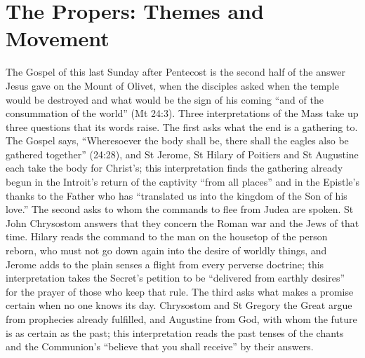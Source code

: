 
\section{The Propers: Themes and Movement}

The Gospel of this last Sunday after Pentecost is the second half of the
answer Jesus gave on the Mount of Olivet, when the disciples asked when the
temple would be destroyed and what would be the sign of his coming ``and of
the consummation of the world'' (Mt 24:3). Three interpretations of the Mass
take up three questions that its words raise. The first asks what the end is
a gathering to. The Gospel says, ``Wheresoever the body shall be, there shall
the eagles also be gathered together'' (24:28), and St Jerome, St Hilary of
Poitiers and St Augustine each take the body for Christ's; this
interpretation finds the gathering already begun in the Introit's return of
the captivity ``from all places'' and in the Epistle's thanks to the Father
who has ``translated us into the kingdom of the Son of his love.'' The second
asks to whom the commands to flee from Judea are spoken. St John Chrysostom
answers that they concern the Roman war and the Jews of that time. Hilary
reads the command to the man on the housetop of the person reborn, who must
not go down again into the desire of worldly things, and Jerome adds to the
plain senses a flight from every perverse doctrine; this interpretation takes
the Secret's petition to be ``delivered from earthly desires'' for the prayer
of those who keep that rule. The third asks what makes a promise certain when
no one knows its day. Chrysostom and St Gregory the Great argue from
prophecies already fulfilled, and Augustine from God, with whom the future is
as certain as the past; this interpretation reads the past tenses of the
chants and the Communion's ``believe that you shall receive'' by their
answers.

